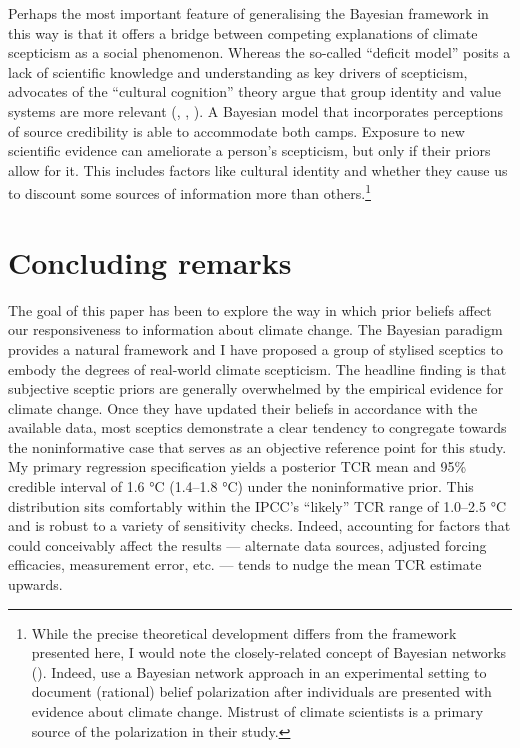 \documentclass[smallextended]{svjour3}       %
\begin{document}
Perhaps the most important feature of generalising the Bayesian
framework in this way is that it offers a bridge between competing
explanations of climate scepticism as a social phenomenon. Whereas the
so-called ``deficit model'' posits a lack of scientific knowledge and
understanding as key drivers of scepticism, advocates of the ``cultural
cognition'' theory argue that group identity and value systems are more
relevant (\cite{kahan2011cultural}, \cite{kahan2012polarizing},
\cite{ranney2016climate}). A Bayesian model that incorporates
perceptions of source credibility is able to accommodate both camps.
Exposure to new scientific evidence can ameliorate a person's
scepticism, but only if their priors allow for it. This includes factors
like cultural identity and whether they cause us to discount some
sources of information more than others.\footnote{While the precise
  theoretical development differs from the framework presented here, I
  would note the closely-related concept of Bayesian networks
  (\cite{pearl2000bayesian}). Indeed, \cite{cook2016rational} use a
  Bayesian network approach in an experimental setting to document
  (rational) belief polarization after individuals are presented with
  evidence about climate change. Mistrust of climate scientists is a
  primary source of the polarization in their study.}

\hypertarget{sec:conclusion}{%
\section{Concluding remarks}\label{sec:conclusion}}

The goal of this paper has been to explore the way in which prior
beliefs affect our responsiveness to information about climate change.
The Bayesian paradigm provides a natural framework and I have proposed a
group of stylised sceptics to embody the degrees of real-world climate
scepticism. The headline finding is that subjective sceptic priors are
generally overwhelmed by the empirical evidence for climate change. Once
they have updated their beliefs in accordance with the available data,
most sceptics demonstrate a clear tendency to congregate towards the
noninformative case that serves as an objective reference point for this
study. My primary regression specification yields a posterior TCR mean
and 95\% credible interval of 1.6 °C (1.4--1.8 °C) under the
noninformative prior. This distribution sits comfortably within the
IPCC's ``likely'' TCR range of 1.0--2.5 °C and is robust to a variety of
sensitivity checks. Indeed, accounting for factors that could
conceivably affect the results --- alternate data sources, adjusted
forcing efficacies, measurement error, etc. --- tends to nudge the mean
TCR estimate upwards.
\end{document}
